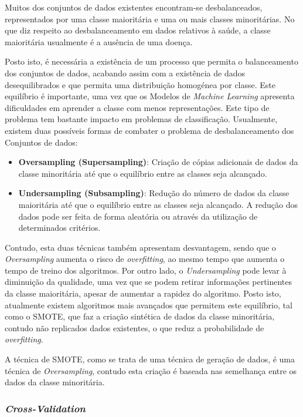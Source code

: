 \documentclass[12pt,a4paper,twoside]{report}
\begin{document}
{Muitos dos conjuntos de dados existentes encontram-se desbalanceados, representados por uma classe maioritária e uma ou mais classes minoritárias. No que diz respeito ao desbalanceamento em dados relativos à saúde, a classe maioritária usualmente é a ausência de uma doença.

Posto isto, é necessária a existência de um processo que permita o balanceamento dos conjuntos de dados, acabando assim com a existência de dados desequilibrados e que permita uma distribuição homogénea por classe. Este equilíbrio é importante, uma vez que os Modelos de \textit{Machine Learning} apresenta dificuldades em aprender a classe com menos representações. Este tipo de problema tem bastante impacto em problemas de classificação. Usualmente, existem duas possíveis formas de combater o problema de desbalanceamento dos Conjuntos de dados:

\begin{itemize} 
\itemsep-0.5em 
    \item {\textbf{Oversampling (Supersampling)}}: Criação de cópias adicionais de dados da classe minoritária até que o equilíbrio entre as classes seja alcançado.
    \item {\textbf{Undersampling (Subsampling)}}: Redução do número de dados da classe maioritária até que o equilíbrio entre as classes seja alcançado. A redução dos dados pode ser feita de forma aleatória ou através da utilização de determinados critérios. 
\end{itemize}

Contudo, esta duas técnicas também apresentam desvantagem, sendo que o \textit{Oversampling} aumenta o risco de \textit{overfitting}, ao mesmo tempo que aumenta o tempo de treino dos algoritmos. Por outro lado, o \textit{Undersampling} pode levar à diminuição da qualidade, uma vez que se podem retirar informações pertinentes da classe maioritária, apesar de aumentar a rapidez do algoritmo. Posto isto, atualmente existem algoritmos mais avançados que permitem este equilíbrio, tal como o \gls{SMOTE}, que faz a criação sintética de dados da classe minoritária, contudo não replicados dados existentes, o que reduz a probabilidade de \textit{overfitting}.

A técnica de \gls{SMOTE}, como se trata de uma técnica de geração de dados, é uma técnica de \textit{Oversampling}, contudo esta criação é baseada nas semelhança entre os dados da classe minoritária.



\subsubsection{\textit{Cross-Validation}}

}
\end{document}
